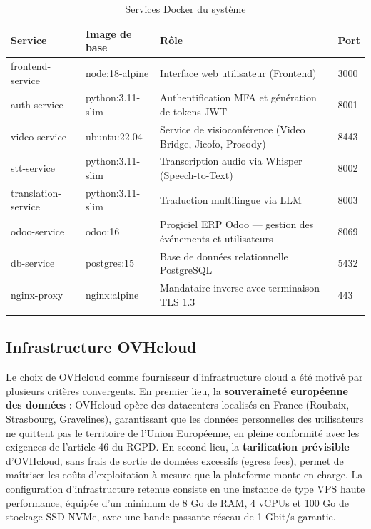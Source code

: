 \begin{longtable}{|m{3.5cm}|m{3.5cm}|m{4.5cm}|m{1cm}|}
\hline
\textbf{Service} & \textbf{Image de base} & \textbf{Rôle} & \textbf{Port} \\
\hline
\endhead
\endfoot
\endlastfoot
\hline
frontend-service & node:18-alpine & Interface web utilisateur (Frontend) & 3000 \\
\hline
auth-service & python:3.11-slim & Authentification MFA et génération de tokens JWT & 8001 \\
\hline
video-service & ubuntu:22.04 & Service de visioconférence (Video Bridge, Jicofo, Prosody) & 8443 \\
\hline
stt-service & python:3.11-slim & Transcription audio via Whisper (Speech-to-Text) & 8002 \\
\hline
translation-service & python:3.11-slim & Traduction multilingue via LLM & 8003 \\
\hline
odoo-service & odoo:16 & Progiciel ERP Odoo — gestion des événements et utilisateurs & 8069 \\
\hline
db-service & postgres:15 & Base de données relationnelle PostgreSQL & 5432 \\
\hline
nginx-proxy & nginx:alpine & Mandataire inverse avec terminaison TLS 1.3 & 443 \\
\hline
\captionsetup{justification=centering,margin=2cm}
\caption{Services Docker du système}
\label{tab:docker}
\end{longtable}

\subsection{Infrastructure OVHcloud}
Le choix de OVHcloud comme fournisseur d'infrastructure cloud a été motivé par plusieurs critères convergents. En premier lieu, la \textbf{souveraineté européenne des données} : OVHcloud opère des datacenters localisés en France (Roubaix, Strasbourg, Gravelines), garantissant que les données personnelles des utilisateurs ne quittent pas le territoire de l'Union Européenne, en pleine conformité avec les exigences de l'article 46 du RGPD. En second lieu, la \textbf{tarification prévisible} d'OVHcloud, sans frais de sortie de données excessifs (egress fees), permet de maîtriser les coûts d'exploitation à mesure que la plateforme monte en charge. La configuration d'infrastructure retenue consiste en une instance de type VPS haute performance, équipée d'un minimum de 8 Go de RAM, 4 vCPUs et 100 Go de stockage SSD NVMe, avec une bande passante réseau de 1 Gbit/s garantie.

